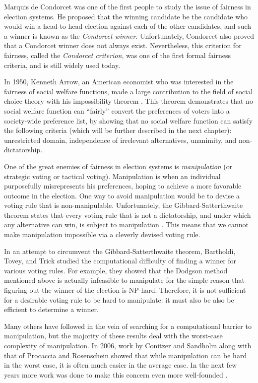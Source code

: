 	Marquis de Condorcet was one of the first people to study the issue of fairness in election systems. He proposed that the winning candidate be the candidate who would win a head-to-head election against each of the other candidates, and such a winner is known as the \emph{Condorcet winner}. Unfortunately, Condorcet also proved that a Condorcet winner does not always exist. Nevertheless, this criterion for fairness, called the \emph{Condorcet criterion}, was one of the first formal fairness criteria, and is still widely used today.

	In 1950, Kenneth Arrow, an American economist who was interested in the fairness of social welfare functions, made a large contribution to the field of social choice theory with his impossibility theorem \cite{arrow1950difficulty, arrow1963social}. This theorem demonstrates that no social welfare function can ``fairly'' convert the preferences of voters into a society-wide preference list, by showing that no social welfare function can satisfy the following criteria (which will be further described in the next chapter): unrestricted domain, independence of irrelevant alternatives, unanimity, and non-dictatorship.

	One of the great enemies of fairness in election systems is \emph{manipulation} (or strategic voting or tactical voting). Manipulation is when an individual purposefully misrepresents his preferences, hoping to achieve a more favorable outcome in the election. One way to avoid manipulation would be to devise a voting rule that is non-manipulable. Unfortunately, the Gibbard-Satterthwaite theorem states that every voting rule that is not a dictatorship, and under which any alternative can win, is subject to manipulation \cite{gibbard1973manipulation, satterthwaite1975strategy, duggan2000strategic}. This means that we cannot make manipulation impossible via a cleverly devised voting rule.

	In an attempt to circumvent the Gibbard-Satterthwaite theorem, Bartholdi, Tovey, and Trick studied the computational difficulty of finding a winner for various voting rules. For example, they showed that the Dodgson method mentioned above \cite{dodgson1876method} is actually infeasible to manipulate for the simple reason that figuring out the winner of the election is NP-hard. Therefore, it is not sufficient for a desirable voting rule to be hard to manipulate: it must also be also be efficient to determine a winner.

	Many others have followed in the vein of searching for a computational barrier to manipulation, but the majority of these results deal with the worst-case complexity of manipulation. In 2006, work by Conitzer and Sandholm \cite{conitzer2006nonexistence} along with that of Procaccia and Rosenschein \cite{procaccia2006junta} showed that while manipulation can be hard in the worst case, it is often much easier in the average case. In the next few years more work was done to make this concern even more well-founded \cite{procaccia2007average, erdelyi2007approximating}.

